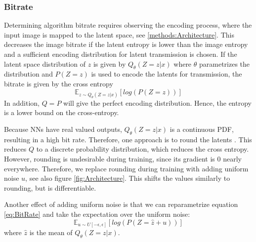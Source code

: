     \subsubsection{Bitrate}
        Determining algorithm bitrate requires observing the encoding
        process, where the input image is mapped to the
        latent space, see \ref{methods:Architecture}. This decreases the
        image bitrate if the latent entropy is lower than the image entropy and a sufficient encoding distribution for latent transmission is chosen. If the latent
        space distribution of $z$ is given by $Q_\theta(Z=z \vert x)$ where $\theta$
        parametrizes the distribution and $P(Z=z)$ is used to encode the latents for transmission, the bitrate is given by the cross entropy
        \begin{equation}\label{eq:BitRate}
            \mathbb{E}_{z \sim Q_\theta(Z=z \vert x)}[log(P(Z=z))]
        \end{equation}
        In addition, $Q=P$ will give the perfect encoding distribution. Hence, the
        entropy is a lower bound on the cross-entropy.

        Because NNs have real valued outputs, ${Q_\theta(Z=z\vert x)}$
         is a continuous PDF, resulting in a high bit rate. Therefore, one
        approach is to round the latents \cite{DBLP:journals/corr/BalleLS16a}. This reduces $Q$ to a discrete
        probability distribution, which reduces the cross entropy. However, rounding
        is undesirable during training, since its gradient is 0 nearly everywhere. Therefore, we replace
        rounding during training with adding uniform noise $u$, see also
        figure \ref{fig:Architecture}. This shifts the values
        similarly to rounding, but is differentiable.

        Another effect of adding uniform noise is that we can reparametrize equation
        \ref{eq:BitRate} and take the expectation over the uniform noise:
        \begin{equation}
            \mathbb{E}_{u \sim U[-\epsilon, \epsilon]}[log(P(Z=\hat{z} + u))]
        \end{equation}
        where $\hat{z}$ is the mean of $Q_\theta(Z=z \vert x)$. \newline



